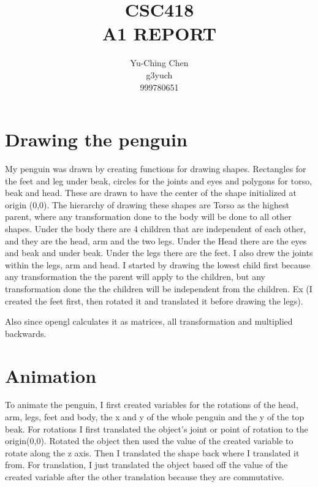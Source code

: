 \documentclass[12pt,a4paper]{article}
\author{Yu-Ching Chen\\g3yuch\\999780651}
\title{CSC418\\A1 REPORT}
\begin{document}
\maketitle
\section*{Drawing the penguin}
My penguin was drawn by creating functions for drawing shapes. Rectangles for the feet and leg under beak, circles for the joints and eyes and polygons for torso, beak and head. These are drawn to have the center of the shape initialized at origin (0,0). The hierarchy of drawing these shapes are Torso as the highest parent, where any transformation done to the body will be done to all other shapes. Under the body there are 4 children that are independent of each other, and they are the head, arm and the two legs. Under the Head there are the eyes and beak and under beak. Under the legs there are the feet. I also drew the joints within the legs, arm and head. I started by drawing the lowest child first because any transformation the the parent will apply to the children, but any transformation done the the children will be independent from the children. Ex (I created the feet first, then rotated it and translated it before drawing the legs).

Also since opengl calculates it as matrices, all transformation and multiplied backwards.

\section*{Animation}
To animate the penguin, I first created variables for the rotations of the head, arm, legs, feet and body, the x and y of the whole penguin and the y of the top beak. For rotations I first translated the object's joint or point of rotation to the origin(0,0). Rotated the object then used the value of the created variable to rotate along the z axis. Then I translated the shape back where I translated it from. For translation, I just translated the object based off the value of the created variable after the other translation because they are commutative.
\end{document}
